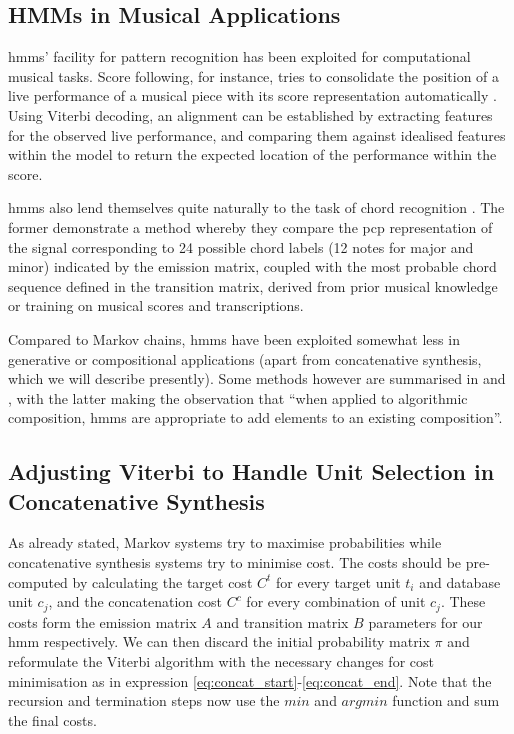 {{{{{{{\subsection{HMMs in Musical Applications}

\acrshort{hmm}s' facility for pattern recognition has been exploited for computational musical tasks. Score following, for instance, tries to consolidate the position of a live performance of a musical piece with its score representation automatically \citep{Orio2003}. Using Viterbi decoding, an alignment can be established by extracting features for the observed live performance, and comparing them against idealised features within the model to return the expected location of the performance within the score.

\acrshort{hmm}s also lend themselves quite naturally to the task of chord recognition \citep{Papadopoulos2007, Cho2010, Sheh2003}. The former demonstrate a method whereby they compare the \acrshort{pcp} representation of the signal corresponding to 24 possible chord labels (12 notes for major and minor) indicated by the emission matrix, coupled with the most probable chord sequence defined in the transition matrix, derived from prior musical knowledge or training on musical scores and transcriptions.

Compared to Markov chains, \acrshort{hmm}s have been exploited somewhat less in generative or compositional applications (apart from concatenative synthesis, which we will describe presently). Some methods however are summarised in \citep{Fernandez2013} and \citep{Nierhaus2009}, with the latter making the observation that “when applied to algorithmic composition, \acrshort{hmm}s are appropriate to add elements to an existing composition”. 

\subsection{Adjusting Viterbi to Handle Unit Selection in Concatenative Synthesis}

As already stated, Markov systems try to maximise probabilities while concatenative synthesis systems try to minimise cost. The costs should be pre-computed by calculating the target cost $C^{t}$ for every target unit $t_i$ and database unit $c_j$, and the concatenation cost $C^{c}$ for every combination of unit $c_j$. These costs form the emission matrix $A$ and transition matrix $B$ parameters for our \acrshort{hmm} respectively. We can then discard the initial probability matrix $\pi$ and reformulate the Viterbi algorithm with the necessary changes for cost minimisation as in expression \ref{eq:concat_start}-\ref{eq:concat_end}. Note that the recursion and termination steps now use the $min$ and $argmin$ function and sum the final costs. 

}}}}}}}
